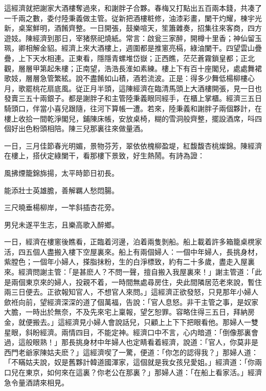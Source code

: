 這經濟就把謝家大酒樓奪過來，和謝胖子合夥。春梅又打點出五百兩本錢，共凑了一千兩之數，委付陸秉義做主管。従新把酒樓粧修，油漆彩畫，闌干灼耀，棟宇光新，桌案鮮明，酒餚齊整。一日開張，鼓樂喧天，笙簫雜奏，招集往來客商，四方遊妓。陳經濟到那日，宰猪祭祀燒紙。常言：啟瓮三家醉，開樽十里香；神仙留玉珮，卿相解金貂。經濟上來大酒樓上，週圍都是推窻亮槅，綠油闌干。四望雲山疊疊，上下天水相連。正東看，隱隱青螺堆岱嶽；正西瞧，茫茫蒼霧鎖皇都；正北觀，層層甲第起朱樓；正南望，浩浩長淮如素練。樓上下有百十座閣兒，處處舞裙歌妓，層層急管繁絃。說不盡餚如山積，酒若流波。正是：得多少舞低楊柳樓心月，歌罷桃花扇底風。従正月半頭，這陳經濟在臨清馬頭上大酒樓開張，見一日也發賣三五十兩銀子。都是謝胖子和主管陸秉義眼同經手，在櫃上掌櫃。經濟三五日騎頭口，伴當小喜兒跟隨，往河下算帳一遭。若來，陸秉義和謝胖子兩個夥計，在樓上收拾一間乾淨閣兒，鋪陳床帳，安放桌椅，糊的雪洞般齊整，擺設酒席，呌四個好出色粉頭相陪。陳三兒那裏往來做量酒。

一日，三月佳節春光明媚，景物芬芳，翠依依槐柳盈堤，紅馥馥杏桃燦錦。陳經濟在樓上，搭伏定綠闌干，看那樓下景致，好生熱鬧。有詩為證：

\begin{myquote}
風拂煙籠錦旆揚，太平時節日初長。

能添壯士英雄膽，善解羈人愁悶腸。

三尺曉垂楊柳岸，一竿斜插杏花旁。

男兒未遂平生志，且樂高歌入醉鄉。
\end{myquote}

一日，經濟在樓窻後瞧看，正臨着河邊，泊着兩隻剝船。船上載着許多箱籠桌櫈家活，四五個人盡搬入樓下空屋裏來。船上有兩個婦人：一個中年婦人，長挑身材，紫膛色；一個年小婦人，搽脂抹粉，生的白淨標致，約有二十多歲，盡走入屋裏來。經濟問謝主管：「是甚麽人？不問一聲，擅自搬入我屋裏來！」謝主管道：「此是兩個東京來的婦人，投親不着，一時間無處尋房住，央此間隣居范老來說，暫住兩三日便去。正欲報知官人，不想官人來問。」這經濟正欲發怒，只見那年小婦人歛袵向前，望經濟深深的道了個萬福，告說：「官人息怒。非干主管之事，是奴家大膽，一時出於無奈，不及先來宅上稟報，望乞恕罪。容略住得三五日，拜納房金，就便搬去。」這經濟見小婦人會說話兒，只顧上上下下把眼看他。那婦人一雙星眼，斜盼經濟。兩情四目，不能定神。經濟口中不言，心内暗道：「倒像那裏會過，這般眼熟！」那長挑身材中年婦人也定睛看着經濟，說道：「官人，你莫非是西門老爺家陳姑夫麽？」這經濟喫了一驚，便道：「你怎的認得我？」那婦人道：「不瞞姑夫說，奴是舊夥計韓道國渾家，這個就是我女孩兒愛姐。」經濟道：「你兩口兒在東京，如何來在這裏？你老公在那裏？」那婦人道：「在船上看家活。」經濟急令量酒請來相見。

